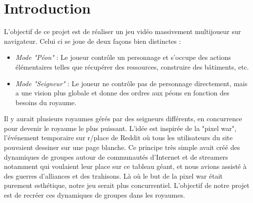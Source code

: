 \section{Introduction}
        L'objectif de ce projet est de réaliser un jeu vidéo massivement multijoueur sur navigateur. Celui ci se joue de deux façons bien distinctes :
        \begin{itemize}
            \item \textit{Mode "Péon"} : Le joueur contrôle un personnage et s'occupe des actions élémentaires telles que récupérer des ressources, construire des bâtiments, etc.
            \item \textit{Mode "Seigneur"} : Le joueur ne contrôle pas de personnage directement, mais a une vision plus globale et donne des ordres aux péons en fonction des besoins du royaume.
        \end{itemize}
        Il y aurait plusieurs royaumes gérés par des seigneurs différents, en concurrence pour devenir le royaume le plus puissant. L'idée est inspirée de la "pixel war", l'événement temporaire sur r/place de Reddit où tous les utilisateurs du site pouvaient dessiner sur une page blanche. Ce principe très simple avait créé des dynamiques de groupes autour de communautés d'Internet et de streamers notamment qui voulaient leur place sur ce tableau géant, et nous avions assisté à des guerres d'alliances et des trahisons. Là où le but de la pixel war était purement esthétique, notre jeu serait plus concurrentiel. L'objectif de notre projet est de recréer ces dynamiques de groupes dans les royaumes.

